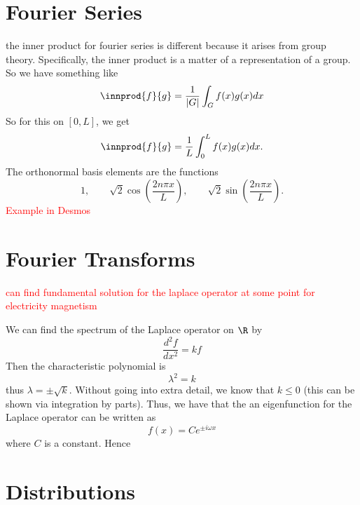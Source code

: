 \section{Fourier Series}


the inner product for fourier series is different because it arises from group theory. Specifically, the inner product is a matter of a representation of a group.  So we have something like 
\[
\innprod{f}{g} = \frac{1}{|G|} \int_G f(x)g(x)dx
\]
So for this on $[0,L]$, we get
\[
\innprod{f}{g} = \frac{1}{L} \int_0^L f(x)g(x)dx.
\]
The orthonormal basis elements are the functions
\[
1, \qquad \sqrt{2}\cos\left(\frac{2n \pi x }{L}\right), \qquad \sqrt{2}\sin\left(\frac{2n \pi x}{L} \right).
\]
\textcolor{red}{Example in Desmos}

\section{Fourier Transforms}
\textcolor{red}{can find fundamental solution for the laplace operator at some point for electricity magnetism}

We can find the spectrum of the Laplace operator on $\R$ by
\[
\frac{d^2f}{dx^2} = kf
\]
Then the characteristic polynomial is
\[
\lambda^2=k
\]
thus $\lambda = \pm \sqrt{k}$. Without going into extra detail, we know that $k\leq 0$ (this can be shown via integration by parts).  Thus, we have that the an eigenfunction for the Laplace operator can be written as
\[
f(x)=Ce^{\pm i\omega x}
\]
where $C$ is a constant.  Hence
\section{Distributions}